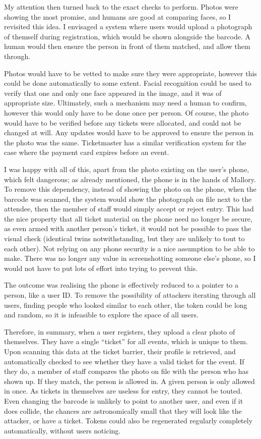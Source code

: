 \documentclass[12pt,a4]{bhamdissertation}
\begin{document}
My attention then turned back to the exact checks to perform. Photos were showing the most promise, and humans are good at comparing faces, so I revisited this idea. I envisaged a system where users would upload a photograph of themself during registration, which would be shown alongside the barcode. A human would then ensure the person in front of them matched, and allow them through.

Photos would have to be vetted to make sure they were appropriate, however this could be done automatically to some extent. Facial recognition could be used to verify that one and only one face appeared in the image, and it was of appropriate size. Ultimately, such a mechanism may need a human to confirm, however this would only have to be done once per person. Of course, the photo would have to be verified before any tickets were allocated, and could not be changed at will. Any updates would have to be approved to ensure the person in the photo was the same. Ticketmaster has a similar verification system for the case where the payment card expires before an event.

I was happy with all of this, apart from the photo existing on the user's phone, which felt dangerous; as already mentioned, the phone is in the hands of Mallory. To remove this dependency, instead of showing the photo on the phone, when the barcode was scanned, the system would show the photograph on file next to the attendee, then the member of staff would simply accept or reject entry. This had the nice property that all ticket material on the phone need no longer be secure, as even armed with another person's ticket, it would not be possible to pass the visual check (identical twins notwithstanding, but they are unlikely to tout to each other). Not relying on any phone security is a nice assumption to be able to make. There was no longer any value in screenshotting someone else's phone, so I would not have to put lots of effort into trying to prevent this.

The outcome was realising the phone is effectively reduced to a pointer to a person, like a user ID. To remove the possibility of attackers iterating through all users, finding people who looked similar to each other, the token could be long and random, so it is infeasible to explore the space of all users.

Therefore, in summary, when a user registers, they upload a clear photo of themselves. They have a single ``ticket'' for all events, which is unique to them. Upon scanning this data at the ticket barrier, their profile is retrieved, and automatically checked to see whether they have a valid ticket for the event. If they do, a member of staff compares the photo on file with the person who has shown up. If they match, the person is allowed in. A given person is only allowed in once. As tickets in themselves are useless for entry, they cannot be touted. Even changing the barcode is unlikely to point to another user, and even if it does collide, the chances are astronomically small that they will look like the attacker, or have a ticket. Tokens could also be regenerated regularly completely automatically, without users noticing.
\end{document}
